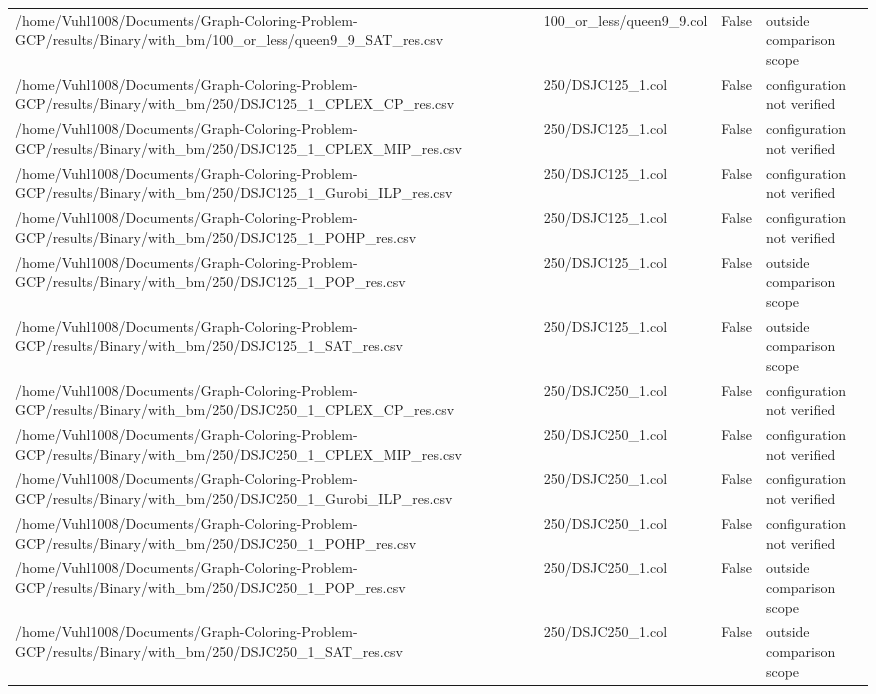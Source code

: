 \begin{table}[htbp]
\begin{tabular}{llll}
/home/Vuhl1008/Documents/Graph-Coloring-Problem-GCP/results/Binary/with\_bm/100\_or\_less/queen9\_9\_SAT\_res.csv & 100\_or\_less/queen9\_9.col & False & outside comparison scope \\
/home/Vuhl1008/Documents/Graph-Coloring-Problem-GCP/results/Binary/with\_bm/250/DSJC125\_1\_CPLEX\_CP\_res.csv & 250/DSJC125\_1.col & False & configuration not verified \\
/home/Vuhl1008/Documents/Graph-Coloring-Problem-GCP/results/Binary/with\_bm/250/DSJC125\_1\_CPLEX\_MIP\_res.csv & 250/DSJC125\_1.col & False & configuration not verified \\
/home/Vuhl1008/Documents/Graph-Coloring-Problem-GCP/results/Binary/with\_bm/250/DSJC125\_1\_Gurobi\_ILP\_res.csv & 250/DSJC125\_1.col & False & configuration not verified \\
/home/Vuhl1008/Documents/Graph-Coloring-Problem-GCP/results/Binary/with\_bm/250/DSJC125\_1\_POHP\_res.csv & 250/DSJC125\_1.col & False & configuration not verified \\
/home/Vuhl1008/Documents/Graph-Coloring-Problem-GCP/results/Binary/with\_bm/250/DSJC125\_1\_POP\_res.csv & 250/DSJC125\_1.col & False & outside comparison scope \\
/home/Vuhl1008/Documents/Graph-Coloring-Problem-GCP/results/Binary/with\_bm/250/DSJC125\_1\_SAT\_res.csv & 250/DSJC125\_1.col & False & outside comparison scope \\
/home/Vuhl1008/Documents/Graph-Coloring-Problem-GCP/results/Binary/with\_bm/250/DSJC250\_1\_CPLEX\_CP\_res.csv & 250/DSJC250\_1.col & False & configuration not verified \\
/home/Vuhl1008/Documents/Graph-Coloring-Problem-GCP/results/Binary/with\_bm/250/DSJC250\_1\_CPLEX\_MIP\_res.csv & 250/DSJC250\_1.col & False & configuration not verified \\
/home/Vuhl1008/Documents/Graph-Coloring-Problem-GCP/results/Binary/with\_bm/250/DSJC250\_1\_Gurobi\_ILP\_res.csv & 250/DSJC250\_1.col & False & configuration not verified \\
/home/Vuhl1008/Documents/Graph-Coloring-Problem-GCP/results/Binary/with\_bm/250/DSJC250\_1\_POHP\_res.csv & 250/DSJC250\_1.col & False & configuration not verified \\
/home/Vuhl1008/Documents/Graph-Coloring-Problem-GCP/results/Binary/with\_bm/250/DSJC250\_1\_POP\_res.csv & 250/DSJC250\_1.col & False & outside comparison scope \\
/home/Vuhl1008/Documents/Graph-Coloring-Problem-GCP/results/Binary/with\_bm/250/DSJC250\_1\_SAT\_res.csv & 250/DSJC250\_1.col & False & outside comparison scope \\

\end{tabular}
\end{table}
